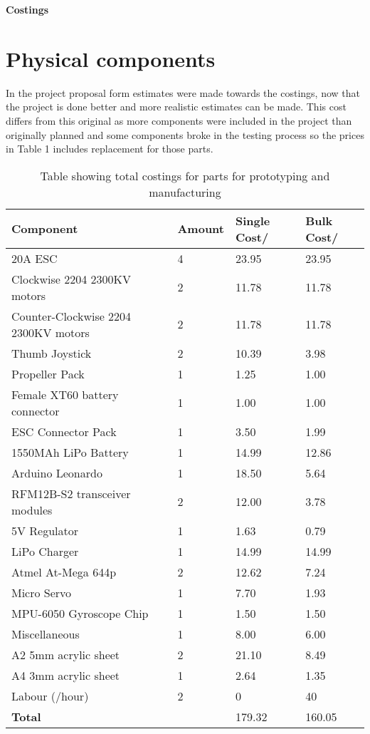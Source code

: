 \documentclass[a4paper,11pt]{article}
\begin{document}
  
\begin{center}
{\Large{\textbf{Costings}}} \\ [\baselineskip]
\end{center}

\section{Physical components}
In the project proposal form estimates were made towards the costings, now that the project is done better and more realistic estimates can be made. This cost differs from this original as more components were included in the project than originally planned and some components broke in the testing process so the prices in Table 1 includes replacement for those parts.
\begin{table}[htp]
\begin{tabular}{|l|l|l|l|}
	\hline
	Component & Amount & Single Cost/\textsterling & Bulk Cost/\textsterling  \\
	\hline
	20A ESC & 4 & 23.95 & 23.95\\
	\hline
	Clockwise 2204 2300KV motors & 2 & 11.78 & 11.78\\
	\hline
    Counter-Clockwise 2204 2300KV motors & 2 & 11.78 & 11.78\\
	\hline
    Thumb Joystick & 2 & 10.39 & 3.98\\
	\hline
	Propeller Pack & 1 & 1.25 & 1.00\\
	\hline
	Female XT60 battery connector & 1 & 1.00 & 1.00\\
	\hline
	ESC Connector Pack & 1 & 3.50 & 1.99\\
	\hline
	1550MAh LiPo Battery & 1 & 14.99 & 12.86\\
	\hline    
	Arduino Leonardo & 1 & 18.50 & 5.64\\
	\hline
	RFM12B-S2 transceiver modules & 2 & 12.00 & 3.78\\
	\hline
	5V Regulator & 1 & 1.63 & 0.79\\
	\hline
	LiPo Charger & 1 & 14.99 & 14.99\\
	\hline
	Atmel At-Mega 644p & 2 & 12.62 & 7.24 \\ 
	\hline
	Micro Servo & 1 & 7.70 & 1.93\\ 
	\hline
	MPU-6050 Gyroscope Chip & 1 & 1.50 & 1.50 \\ 
	\hline
	Miscellaneous  & 1 & 8.00 & 6.00\\ 
	\hline
	A2 5mm acrylic sheet  & 2 & 21.10 & 8.49 \\ 
	\hline
	A4 3mm acrylic sheet  & 1 & 2.64 & 1.35\\ 
	\hline
    Labour (\textsterling20/hour)  & 2 & 0 & 40\\ 
	\hline
	\textbf{Total}& &179.32&160.05\\
	\hline
\end{tabular}
\caption{Table showing total costings for parts for prototyping and manufacturing}
\end{table}
\end{document}
